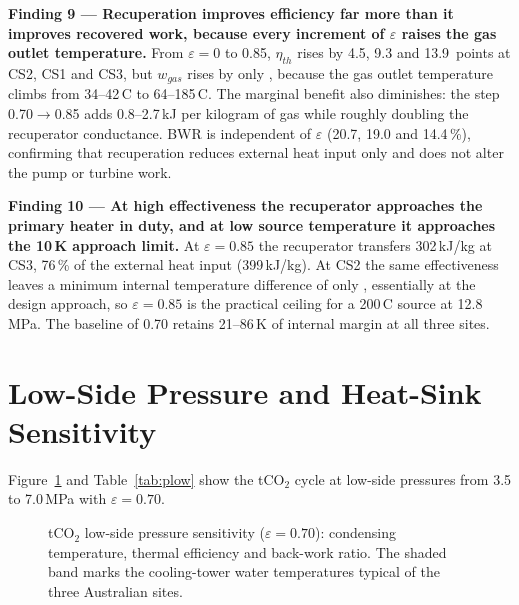 \begin{findingbox}
\textbf{Finding 9 --- Recuperation improves efficiency far more than it
improves recovered work, because every increment of $\varepsilon$ raises the
gas outlet temperature.}
From $\varepsilon = 0$ to 0.85, $\eta_{th}$ rises by 4.5, 9.3 and
13.9~points at CS2, CS1 and CS3, but $w_{gas}$ rises by only
, because the gas outlet temperature
climbs from 34--42\,\textdegree C to 64--185\,\textdegree C. The marginal
benefit also diminishes: the step 0.70$\to$0.85 adds 0.8--2.7\,kJ per
kilogram of gas while roughly doubling the recuperator conductance. BWR is
independent of $\varepsilon$ (20.7, 19.0 and 14.4\,\%), confirming that
recuperation reduces external heat input only and does not alter the pump or
turbine work.
\end{findingbox}

\begin{findingbox}
\textbf{Finding 10 --- At high effectiveness the recuperator approaches the
primary heater in duty, and at low source temperature it approaches the
10\,K approach limit.}
At $\varepsilon = 0.85$ the recuperator transfers 302\,kJ/kg at CS3, 76\,\%
of the external heat input (399\,kJ/kg). At CS2 the same effectiveness leaves
a minimum internal temperature difference of only ,
essentially at the design approach, so $\varepsilon = 0.85$ is the practical
ceiling for a 200\,\textdegree C source at 12.8\,MPa. The baseline of 0.70
retains 21--86\,K of internal margin at all three sites.
\end{findingbox}

\section{Low-Side Pressure and Heat-Sink Sensitivity}
\label{sec:plow_sensitivity}

Figure~\ref{fig:plow_sensitivity} and Table~\ref{tab:plow} show the tCO$_2$
cycle at low-side pressures from 3.5 to 7.0\,MPa with $\varepsilon = 0.70$.

\begin{figure}[H]
\centering
{}
\caption{tCO$_2$ low-side pressure sensitivity ($\varepsilon = 0.70$):
condensing temperature, thermal efficiency and back-work ratio. The shaded
band marks the cooling-tower water temperatures typical of the three
Australian sites.}
\label{fig:plow_sensitivity}
\end{figure}

